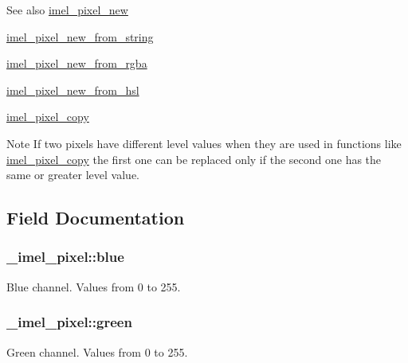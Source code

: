 \begin{DoxySeeAlso}{See also}
\hyperlink{pixel_8c_aaf2dba6a30b6612b7c1730195935a88d}{imel\+\_\+pixel\+\_\+new} 

\hyperlink{pixel_8c_a0d1c4cb614847e8084854f40d05d0eb7}{imel\+\_\+pixel\+\_\+new\+\_\+from\+\_\+string} 

\hyperlink{pixel_8c_af701f338fec84020c7e812f7c1eb84df}{imel\+\_\+pixel\+\_\+new\+\_\+from\+\_\+rgba} 

\hyperlink{pixel_8c_a8ba2bb2ac90703240cd2c7556a4b9680}{imel\+\_\+pixel\+\_\+new\+\_\+from\+\_\+hsl} 

\hyperlink{pixel_8c_a9bc6aa8b3ec663f1635827b0ebbdf46a}{imel\+\_\+pixel\+\_\+copy}
\end{DoxySeeAlso}
\begin{DoxyNote}{Note}
If two pixels have different level values when they are used in functions like \hyperlink{pixel_8c_a9bc6aa8b3ec663f1635827b0ebbdf46a}{imel\+\_\+pixel\+\_\+copy} the first one can be replaced only if the second one has the same or greater level value. 
\end{DoxyNote}


\subsection{Field Documentation}
\subsubsection[{\texorpdfstring{blue}{blue}}]{ \+\_\+imel\+\_\+pixel\+::blue}\hypertarget{struct__imel__pixel_a1e3b4f517f6a56b353f4ed58f880a08e}{}\label{struct__imel__pixel_a1e3b4f517f6a56b353f4ed58f880a08e}
Blue channel. Values from 0 to 255. 
\subsubsection[{\texorpdfstring{green}{green}}]{ \+\_\+imel\+\_\+pixel\+::green}\hypertarget{struct__imel__pixel_a3776e5a017e15b9dfad83b90b58e982e}{}\label{struct__imel__pixel_a3776e5a017e15b9dfad83b90b58e982e}
Green channel. Values from 0 to 255. 

